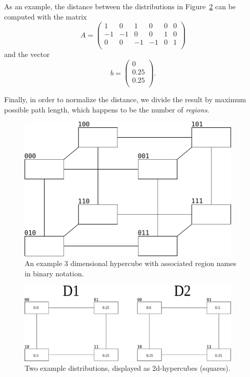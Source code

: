 \documentclass{article}
\begin{document}
As an example, the distance between the distributions in Figure~\ref{fig:distributions-example} can be computed with the
matrix
\begin{equation*}
  A = \begin{pmatrix}
    1  & 0  & 1  & 0  & 0 & 0 \\
    -1 & -1 & 0  & 0  & 1 & 0 \\
    0  & 0  & -1 & -1 & 0 & 1 \\
  \end{pmatrix}
\end{equation*}
and the vector
\begin{equation*}
  b = \begin{pmatrix}
    0    \\
    0.25 \\
    0.25 \\
  \end{pmatrix}.
\end{equation*}

Finally, in order to normalize the distance, we divide the result by maximum possible path length, which happens to be
the number of \textit{regions}.

\begin{figure}
  \begin{center}
    \includegraphics[width=0.95\textwidth]{figures/hypercube-distribution.pdf}
  \end{center}
  \caption{An example 3 dimensional hypercube with associated region names in binary notation.}
  \label{fig:hypercube}
\end{figure}

\begin{figure}
  \begin{center}
    \includegraphics[width=0.95\textwidth]{figures/example-distributions.pdf}
  \end{center}
  \caption{Two example distributions, displayed as 2d-hypercubes (squares).}
  \label{fig:distributions-example}
\end{figure}
\end{document}
